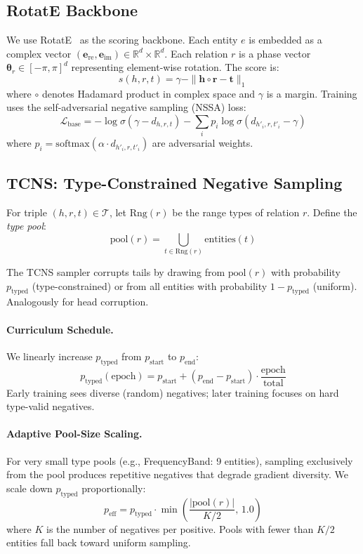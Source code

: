 \documentclass[10pt,twocolumn]{article}
\begin{document}
\subsection{RotatE Backbone}

We use RotatE~\cite{sun2019rotate} as the scoring backbone. Each entity $e$ is
embedded as a complex vector $(\mathbf{e}_{\text{re}}, \mathbf{e}_{\text{im}}) \in
\mathbb{R}^d \times \mathbb{R}^d$. Each relation $r$ is a phase vector
$\boldsymbol{\theta}_r \in [-\pi, \pi]^d$ representing element-wise rotation.
The score is:
\[
  s(h, r, t) = \gamma - \| \mathbf{h} \circ \mathbf{r} - \mathbf{t} \|_1
\]
where $\circ$ denotes Hadamard product in complex space and $\gamma$ is a margin.
Training uses the self-adversarial negative sampling (NSSA) loss:
\[
  \mathcal{L}_{\text{base}} = -\log\sigma(\gamma - d_{h,r,t})
  - \textstyle\sum_i p_i \log \sigma(d_{h'_i,r,t'_i} - \gamma)
\]
where $p_i = \text{softmax}(\alpha \cdot d_{h'_i,r,t'_i})$ are adversarial weights.

\subsection{TCNS: Type-Constrained Negative Sampling}

For triple $(h, r, t) \in \mathcal{T}$, let $\text{Rng}(r)$ be the range types
of relation $r$. Define the \emph{type pool}:
\[
  \text{pool}(r) = \bigcup_{t \in \text{Rng}(r)} \text{entities}(t)
\]

The TCNS sampler corrupts tails by drawing from $\text{pool}(r)$ with probability
$p_{\text{typed}}$ (type-constrained) or from all entities with probability
$1 - p_{\text{typed}}$ (uniform). Analogously for head corruption.

\paragraph{Curriculum Schedule.}
We linearly increase $p_{\text{typed}}$ from $p_{\text{start}}$ to $p_{\text{end}}$:
\[
  p_{\text{typed}}(\text{epoch}) = p_{\text{start}} + (p_{\text{end}} - p_{\text{start}}) \cdot
  \frac{\text{epoch}}{\text{total}}
\]
Early training sees diverse (random) negatives; later training focuses on hard
type-valid negatives.

\paragraph{Adaptive Pool-Size Scaling.}
For very small type pools (e.g., FrequencyBand: 9 entities), sampling exclusively
from the pool produces repetitive negatives that degrade gradient diversity.
We scale down $p_{\text{typed}}$ proportionally:
\[
  p_{\text{eff}} = p_{\text{typed}} \cdot \min\!\left(\frac{|\text{pool}(r)|}{K/2},\, 1.0\right)
\]
where $K$ is the number of negatives per positive. Pools with fewer than $K/2$
entities fall back toward uniform sampling.
\end{document}
